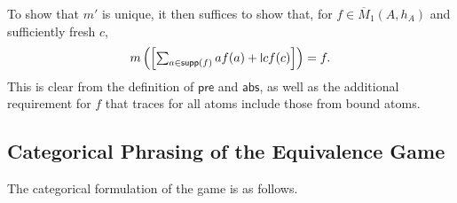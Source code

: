 \documentclass[11pt,a4paper]{amsart}
\newcommand{\pre}{\mathsf{pre}}
\newcommand{\abs}{\mathsf{abs}}
\newcommand{\supp}{\mathsf{supp}}
\newcommand{\mbar}{\overline{M}_1}
\theoremstyle{plain}
\newcommand{\midmid}{\hspace{0.2ex}{\rule[-0.1ex]{0.6pt}{1.65ex}}\hspace{0.2ex}}
\newcommand{\newletter}[1]{{\midmid}#1}
\numberwithin{equation}{section}
\newcommand{\+}[1]{\mathcal{#1}\xspace}
\theoremstyle{definition}
\begin{document}
To show that \(m'\) is unique, it then suffices to show that, for \(f \in \mbar(A, h_A)\) and sufficiently fresh \(c\),
\begin{equation*}\textstyle
  m\left( \left[ \sum_{a \in \supp(f)} a f(a) + \newletter{c} f(c) \right] \right) = f.
\end{equation*}
This is clear from the definition of \(\pre\) and \(\abs\), as well as the additional requirement for \(f\) that traces for all atoms include those from bound atoms.



\subsection*{Categorical Phrasing of the Equivalence Game}

The categorical formulation of the game is as follows.
\end{document}
